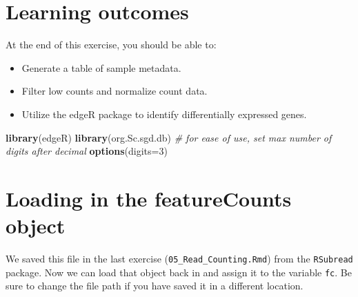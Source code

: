 \documentclass[
]{book}
\newenvironment{Shaded}{\begin{snugshade}}{\end{snugshade}}
\newcommand{\AttributeTok}[1]{\textcolor[rgb]{0.13,0.29,0.53}{#1}}
\newcommand{\CommentTok}[1]{\textcolor[rgb]{0.56,0.35,0.01}{\textit{#1}}}
\newcommand{\DecValTok}[1]{\textcolor[rgb]{0.00,0.00,0.81}{#1}}
\newcommand{\FunctionTok}[1]{\textcolor[rgb]{0.13,0.29,0.53}{\textbf{#1}}}
\newcommand{\NormalTok}[1]{#1}
\newcommand{\OtherTok}[1]{\textcolor[rgb]{0.56,0.35,0.01}{#1}}
\newcommand{\SpecialCharTok}[1]{\textcolor[rgb]{0.81,0.36,0.00}{\textbf{#1}}}
\newcommand{\StringTok}[1]{\textcolor[rgb]{0.31,0.60,0.02}{#1}}
\providecommand{\tightlist}{%
  \setlength{\itemsep}{0pt}\setlength{\parskip}{0pt}}
\begin{document}
\hypertarget{learning-outcomes-3}{%
\section{Learning outcomes}\label{learning-outcomes-3}}

At the end of this exercise, you should be able to:

\begin{itemize}
\tightlist
\item
  Generate a table of sample metadata.
\item
  Filter low counts and normalize count data.
\item
  Utilize the edgeR package to identify differentially expressed
  genes.
\end{itemize}

\begin{Shaded}
\begin{Highlighting}[]
\FunctionTok{library}\NormalTok{(edgeR)}
\FunctionTok{library}\NormalTok{(org.Sc.sgd.db)}
\CommentTok{\# for ease of use, set max number of digits after decimal}
\FunctionTok{options}\NormalTok{(}\AttributeTok{digits=}\DecValTok{3}\NormalTok{)}
\end{Highlighting}
\end{Shaded}

\hypertarget{loading-in-the-featurecounts-object}{%
\section{Loading in the featureCounts object}\label{loading-in-the-featurecounts-object}}

We saved this file in the last exercise (\texttt{05\_Read\_Counting.Rmd}) from the
\texttt{RSubread} package. Now we can load that object back in and assign it to
the variable \texttt{fc}. Be sure to change the file path if you have saved it
in a different location.

\begin{Shaded}
\end{Shaded}
\end{document}
